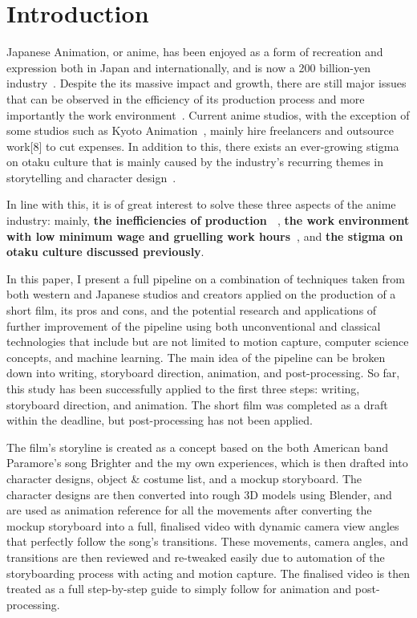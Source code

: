 \section{Introduction}

Japanese Animation, or anime, has been enjoyed as a form of recreation and expression both in Japan and internationally, and is now a 200 billion-yen industry~\cite{animeIndustry200B, animeIndustry200B2}. Despite the its massive impact and growth, there are still major issues that can be observed in the efficiency of its production process and more importantly the work environment~\cite{NHKAnimeIndustry}. Current anime studios, with the exception of some studios such as Kyoto Animation~\cite{kyoAniRecruit}, mainly hire freelancers and outsource work[8] to cut expenses. In addition to this, there exists an ever-growing stigma on otaku culture that is mainly caused by the industry's recurring themes in storytelling and character design~\cite{otakuObsessed, otakuMeaning, otakuWhyHated}.

In line with this, it is of great interest to solve these three aspects of the anime industry: mainly, \textbf{the inefficiencies of production ~\cite{animeProductionFull, animeProductionDb, animeProductionSummary, animeProductionJapan}}, \textbf{the work environment with low minimum wage and gruelling work hours~\cite{animeIndustryHowLowSalary}}, and \textbf{the stigma on otaku culture discussed previously}.

In this paper, I present a full pipeline on a combination of techniques taken from both western and Japanese studios and creators applied on the production of a short film, its pros and cons, and the potential research and applications of further improvement of the pipeline using both unconventional and classical technologies that include but are not limited to motion capture, computer science concepts, and machine learning. The main idea of the pipeline can be broken down into writing, storyboard direction, animation, and post-processing. So far, this study has been successfully applied to the first three steps: writing, storyboard direction, and animation. The short film was completed as a draft within the deadline, but post-processing has not been applied.

The film's storyline is created as a concept based on the both American band Paramore's song Brighter and the my own experiences, which is then drafted into character designs, object \& costume list, and a mockup storyboard. The character designs are then converted into rough 3D models using Blender, and are used as animation reference for all the movements after converting the mockup storyboard into a full, finalised video with dynamic camera view angles that perfectly follow the song's transitions. These movements, camera angles, and transitions are then reviewed and re-tweaked easily due to automation of the storyboarding process with acting and motion capture. The finalised video is then treated as a full step-by-step guide to simply follow for animation and post-processing.

